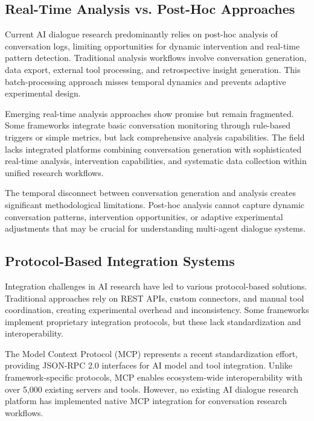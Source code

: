 \documentclass[11pt,letterpaper]{article}
\begin{document}
\subsection{Real-Time Analysis vs. Post-Hoc Approaches}

Current AI dialogue research predominantly relies on post-hoc analysis of conversation logs, limiting opportunities for dynamic intervention and real-time pattern detection. Traditional analysis workflows involve conversation generation, data export, external tool processing, and retrospective insight generation. This batch-processing approach misses temporal dynamics and prevents adaptive experimental design.

Emerging real-time analysis approaches show promise but remain fragmented. Some frameworks integrate basic conversation monitoring through rule-based triggers or simple metrics, but lack comprehensive analysis capabilities. The field lacks integrated platforms combining conversation generation with sophisticated real-time analysis, intervention capabilities, and systematic data collection within unified research workflows.

The temporal disconnect between conversation generation and analysis creates significant methodological limitations. Post-hoc analysis cannot capture dynamic conversation patterns, intervention opportunities, or adaptive experimental adjustments that may be crucial for understanding multi-agent dialogue systems.

\subsection{Protocol-Based Integration Systems}

Integration challenges in AI research have led to various protocol-based solutions. Traditional approaches rely on REST APIs, custom connectors, and manual tool coordination, creating experimental overhead and inconsistency. Some frameworks implement proprietary integration protocols, but these lack standardization and interoperability.

The Model Context Protocol (MCP) represents a recent standardization effort, providing JSON-RPC 2.0 interfaces for AI model and tool integration. Unlike framework-specific protocols, MCP enables ecosystem-wide interoperability with over 5,000 existing servers and tools. However, no existing AI dialogue research platform has implemented native MCP integration for conversation research workflows.
\end{document}
